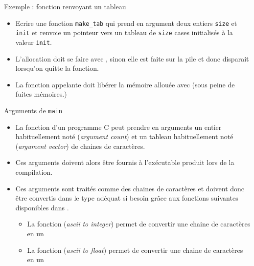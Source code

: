 \documentclass[10pt]{beamer}
\begin{document}
\begin{frame}[fragile]{\Ctitle}{\stitle}
	\begin{exampleblock}{Exemple : fonction renvoyant un tableau}
		\begin{itemize} \item<1-> Ecrire une fonction {\tt make\_tab} qui prend en argument deux entiers {\tt size} et {\tt init} et renvoie un pointeur vers un tableau de {\tt size} cases initialisés à la valeur {\tt init}.
		\onslide<2->
		\item<3-> \textcolor{BrickRed}{\small \danger} L'allocation \textcolor{BrickRed}{doit} se faire avec , sinon elle est faite sur la pile et donc disparait lorsqu'on quitte la fonction.
		\item<4-> La fonction appelante doit libérer la mémoire allouée avec  (sous peine de fuites mémoires.) 
		\end{itemize}
	\end{exampleblock}
\end{frame}

\begin{frame}{\Ctitle}{\stitle}
	\begin{block}{Arguments de {\tt main}}
		\begin{itemize}
			\item<1-> La fonction  d'un programme C peut prendre en arguments un entier habituellement noté  (\textit{argument count}) et un tableau habituellement noté  (\textit{argument vector}) de chaines de caractères.
			\item<2-> Ces arguments doivent alors être fournis à l'exécutable produit lors de la compilation.
			\item<3-> Ces arguments sont traités comme des chaines de caractères et doivent donc être convertis dans le type adéquat si besoin grâce aux fonctions suivantes disponibles dans .
				\begin{itemize}
					\item<4-> La fonction  (\textit{{\sc ascii} to integer}) permet de convertir une chaine de caractères en un 
					\item<5-> La fonction  (\textit{{\sc ascii} to float}) permet de convertir une chaine de caractères en un 
				\end{itemize}

		\end{itemize}
	\end{block}
\end{frame}
\end{document}
